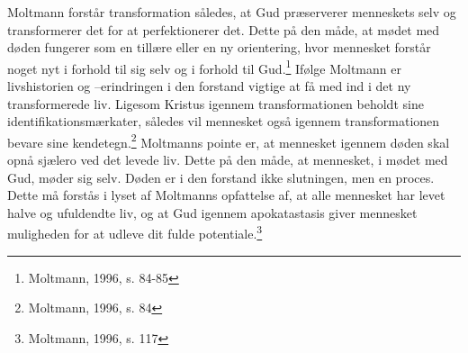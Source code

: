 Moltmann forstår transformation således, at Gud præserverer menneskets selv og transformerer det for at perfektionerer det. Dette på den måde, at mødet med døden fungerer som en tillære eller en ny orientering, hvor mennesket forstår noget nyt i forhold til sig selv og i forhold til Gud.\footnote{Moltmann, 1996, s. 84-85} Ifølge Moltmann er livshistorien og –erindringen i den forstand vigtige at få med ind i det ny transformerede liv. Ligesom Kristus igennem transformationen beholdt sine identifikationsmærkater, således vil mennesket også igennem transformationen bevare sine kendetegn.\footnote{Moltmann, 1996, s. 84} Moltmanns pointe er, at mennesket igennem døden skal opnå sjælero ved det levede liv. Dette på den måde, at mennesket, i mødet med Gud, møder sig selv. Døden er i den forstand ikke slutningen, men en proces. Dette må forstås i lyset af Moltmanns opfattelse af, at alle mennesket har levet halve og ufuldendte liv, og at Gud igennem apokatastasis giver mennesket muligheden for at udleve dit fulde potentiale.\footnote{Moltmann, 1996, s. 117} 


